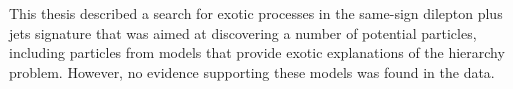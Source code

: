 This thesis described a search for exotic processes in the same-sign dilepton plus jets signature that
was aimed at discovering a number of potential particles, including particles from models that provide
exotic explanations of the hierarchy problem.
However, no evidence supporting these models was found in the data.

